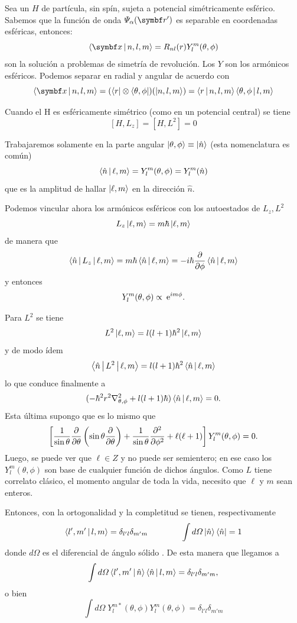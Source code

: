 \documentclass[10pt,oneside]{CBFT_book}
\begin{document}
Sea un $H$ de partícula, sin spín, sujeta a potencial simétricamente esférico. Sabemos que la función de onda 
$\Psi_\alpha(\vb{r}')$ es separable en coordenadas esféricas, entonces:
\[
	\Braket{ \vbx |n,l,m} = R_{nl}(r)Y_l^m(\theta,\phi)
\]
son la solución a problemas de simetría de revolución. Los $Y$ son los armónicos esféricos.
Podemos separar en radial y angular de acuerdo con
\[
	\Braket{ \vbx |n,l,m} = (\Bra{{r}}\otimes\Bra{\theta,\phi})(\Ket{n,l,m})=
	\Braket{r|n,l,m}\Braket{\theta,\phi|l,m}
\]

Cuando el H es esféricamente simétrico (como en un potencial central) se tiene 
\[
	[H,L_z] = [H,L^2] = 0
\]

Trabajaremos solamente en la parte angular  $\Ket{\theta,\phi} \equiv \Ket{\hat{n}}$
(esta nomenclatura es común)
\[
	\Braket{\hat{n}|\ell,m} = Y_l^m(\theta,\phi) = Y_l^m(\hat{n})
\]
que es la amplitud de hallar $\Ket{\ell,m}$ en la dirección $\hat{n}$.

Podemos vincular ahora los armónicos esféricos con los autoestados de $L_z,L^2$
\[
	L_z \Ket{\ell,m} = m\hbar\Ket{\ell,m}
\]
de manera que 
\[
	\Braket{\hat{n}|L_z|\ell,m} = m\hbar \Braket{\hat{n}|\ell,m} =
	-i\hbar \dpar{}{\phi} \Braket{\hat{n}|\ell,m}
\]
y entonces 
\[
	Y_l^m(\theta,\phi) \propto \euler^{im\phi}.
\]

Para $L^2$ se tiene
\[
	L^2 \Ket{\ell,m} = l(l+1)\hbar^2\Ket{\ell,m}
\]
y de modo ídem
\[
	\Braket{\hat{n}|L^2|\ell,m} = l(l+1)\hbar^2\Braket{\hat{n}|\ell,m}
\]
lo que conduce finalmente a
\[
	( -\hbar^2 r^2 \nabla^2_{\theta,\phi} + l(l+1)\hbar )\Braket{\hat{n}|\ell,m} = 0.
\]
Esta última supongo que es lo mismo que
\[
	\left[ \frac{1}{\sin\theta} \dpar{}{\theta}\left(\sin\theta\dpar{}{\theta}\right)
	+ \frac{1}{\sin\theta} \dpar[2]{}{\phi} + \ell (\ell+1)
	\right] Y_l^m(\theta,\phi) = 0.
\]
Luego, se puede ver que $\ell\in Z$ y no puede ser semientero; en ese caso los $ Y_l^m(\theta,\phi)$
son base de cualquier función de dichos ángulos.
Como $L$ tiene correlato clásico, el momento angular de toda la vida, necesito que $\ell$ y $m$ sean 
enteros.


Entonces, con la ortogonalidad y la completitud se tienen, respectivamente 
\[
	\Braket{l',m'|l,m} = \delta_{l'l} \delta_{m'm}
	\qquad \qquad 
	\int d\Omega \Ket{\hat{n}}\Bra{\hat{n}} = 1
\]
donde $d\Omega$ es el diferencial de ángulo sólido 
. 
De esta manera que llegamos a 
\[
	\int d\Omega \Braket{l',m'|\hat{n}} \Braket{\hat{n}|l,m} = \delta_{l'l} \delta_{m'm},
\]
o bien
\[
	\int d\Omega \; Y_l^{m*}(\theta,\phi)  Y_l^m(\theta,\phi)  = \delta_{l'l} \delta_{m'm}
\]
\end{document}
